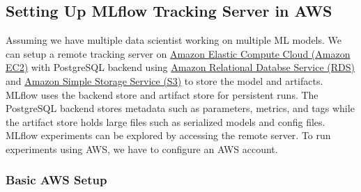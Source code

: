 \documentclass[letterpaper,12pt,notitlepage,twoside]{report}
\begin{document}
\subsection{Setting Up MLflow Tracking Server in AWS}
Assuming we have multiple data scientist working on multiple ML models. We can setup a remote tracking server on \href{https://aws.amazon.com/ec2/}{Amazon Elastic Compute Cloud (Amazon EC2)} with PostgreSQL backend using \href{https://aws.amazon.com/rds/}{Amazon Relational Databse Service (RDS)} and \href{https://aws.amazon.com/s3/}{Amazon Simple Storage Service (S3)} to store the model and artifacts. MLflow uses the backend store and artifact store for persistent runs. The PostgreSQL backend stores metadata such as parameters, metrics, and tags while the artifact store holds large files such as serialized models and config files. MLflow experiments can be explored by accessing the remote server. To run experiments using AWS, we have to configure an AWS account.

\subsubsection{Basic AWS Setup}
\end{document}
